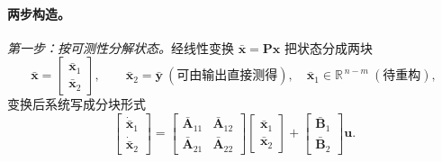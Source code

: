 \paragraph{两步构造。}
\emph{第一步：按可测性分解状态。}\;经线性变换 $\bar{\mathbf x}=\mathbf P\mathbf x$ 把状态分成两块
\begin{equation}
  \bar{\mathbf x}=\begin{bmatrix}\bar{\mathbf x}_1\\\bar{\mathbf x}_2\end{bmatrix},\qquad \bar{\mathbf x}_2=\bar{\mathbf y}\ (\text{可由输出直接测得}),\quad \bar{\mathbf x}_1\in\mathbb R^{\,n-m}\ (\text{待重构}),
  \label{eq:syn-red-split}
\end{equation}
变换后系统写成分块形式
\begin{equation}
  \begin{bmatrix}\dot{\bar{\mathbf x}}_1\\\dot{\bar{\mathbf x}}_2\end{bmatrix}=\begin{bmatrix}\bar{\mathbf A}_{11}&\bar{\mathbf A}_{12}\\\bar{\mathbf A}_{21}&\bar{\mathbf A}_{22}\end{bmatrix}\begin{bmatrix}\bar{\mathbf x}_1\\\bar{\mathbf x}_2\end{bmatrix}+\begin{bmatrix}\bar{\mathbf B}_1\\\bar{\mathbf B}_2\end{bmatrix}\mathbf u.
  \label{eq:syn-red-block}
\end{equation}

